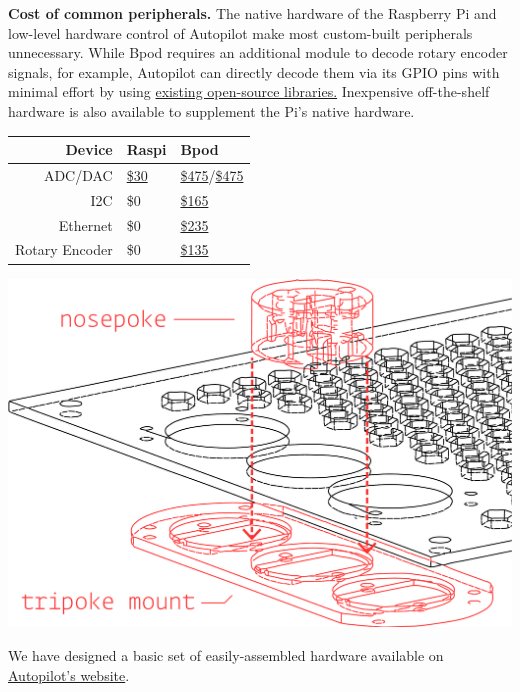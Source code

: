 \documentclass[nohyper, justified, notitlepage, marginals=raggedright,twoside=false,debug]{tufte-autopilot}
\begin{document}
\begin{margintable}[0.3cm]
\caption{
\textbf{Cost of common peripherals.} The native hardware of the Raspberry Pi and low-level hardware control of Autopilot make most custom-built peripherals unnecessary. While Bpod requires an additional module to decode rotary encoder signals, for example, Autopilot can directly decode them via its GPIO pins with minimal effort by using \href{https://pypi.org/project/pigpio-encoder/}{existing open-source libraries.} Inexpensive off-the-shelf hardware is also available to supplement the Pi's native hardware.}
\label{tab:periphs}
\noindent\begin{tabularx}{\linewidth}{Rll}
\toprule
\textbf{Device} & Raspi & Bpod \\
\midrule
ADC/DAC & \href{https://www.seeedstudio.com/Raspberry-Pi-High-Precision-AD-DA-Board-p-2765.html}{\$30} &  \href{https://sanworks.io/shop/viewproduct?productID=1021}{\$475}/\href{https://sanworks.io/shop/viewproduct?productID=1013}{\$475}\\
I2C & \$0 & \href{https://sanworks.io/shop/viewproduct?productID=1019}{\$165} \\
Ethernet & \$0 & \href{https://sanworks.io/shop/viewproduct?productID=1025}{\$235} \\
Rotary Encoder & \$0 &  \href{https://sanworks.io/shop/viewproduct?productID=1022}{\$135}\\
\bottomrule
\end{tabularx}
\end{margintable}

\begin{marginfigure}[1cm]
\includegraphics[]{figures/pokeport.pdf}
\caption{We have designed a basic set of easily-assembled hardware available on \href{https://auto-pi-lot.com/hardware/}{Autopilot's website}.}
\label{fig:pokeport}
\end{marginfigure}%
\end{document}
